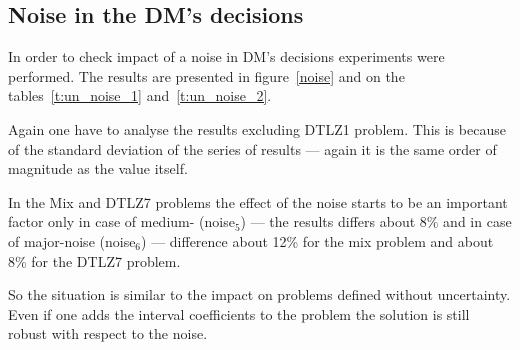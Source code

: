 \clearpage{}

\subsection{Noise in the DM's decisions}

In order to check impact of a noise in DM's decisions experiments were
performed. The results are presented in figure~\ref{noise} and on the
tables~\ref{t:un_noise_1} and~\ref{t:un_noise_2}.

Again one have to analyse the results excluding DTLZ1 problem. This is because
of the standard deviation of the series of results --- again it is the same
order of magnitude as the value itself.

In the Mix and DTLZ7 problems the effect of the noise starts to be an
important factor only in case of medium- (noise$_5$) --- the results differs
about $8\%$ and in case of major-noise (noise$_6$) --- difference about 12\%
for the mix problem and about 8\% for the DTLZ7 problem.

So the situation is similar to the impact on problems defined without
uncertainty. Even if one adds the interval coefficients to the problem the
solution is still robust with respect to the noise.


